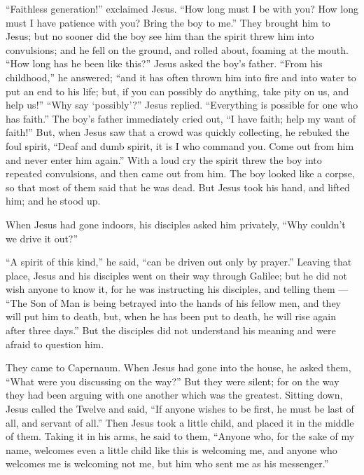  ``Faithless generation!'' exclaimed Jesus. ``How long must
I be with you? How long must I have patience with you? Bring the boy to
me.''  They brought him to Jesus; but no sooner did the boy
see him than the spirit threw him into convulsions; and he fell on the
ground, and rolled about, foaming at the mouth.  ``How long
has he been like this?'' Jesus asked the boy's father. 
``From his childhood,'' he answered; ``and it has often thrown him into
fire and into water to put an end to his life; but, if you can possibly
do anything, take pity on us, and help us!''  ``Why say
`possibly'?'' Jesus replied. ``Everything is possible for one who has
faith.''  The boy's father immediately cried out, ``I have
faith; help my want of faith!''  But, when Jesus saw that a
crowd was quickly collecting, he rebuked the foul spirit, ``Deaf and
dumb spirit, it is I who command you. Come out from him and never enter
him again.''  With a loud cry the spirit threw the boy into
repeated convulsions, and then came out from him. The boy looked like a
corpse, so that most of them said that he was dead.  But
Jesus took his hand, and lifted him; and he stood up.

 When Jesus had gone indoors, his disciples asked him
privately, ``Why couldn't we drive it out?''

 ``A spirit of this kind,'' he said, ``can be driven out
only by prayer.''  Leaving that place, Jesus and his
disciples went on their way through Galilee; but he did not wish anyone
to know it,  for he was instructing his disciples, and
telling them --- ``The Son of Man is being betrayed into the hands of
his fellow men, and they will put him to death, but, when he has been
put to death, he will rise again after three days.''  But
the disciples did not understand his meaning and were afraid to question
him.

 They came to Capernaum. When Jesus had gone into the
house, he asked them, ``What were you discussing on the way?''
 But they were silent; for on the way they had been arguing
with one another which was the greatest.  Sitting down,
Jesus called the Twelve and said, ``If anyone wishes to be first, he
must be last of all, and servant of all.''  Then Jesus took
a little child, and placed it in the middle of them. Taking it in his
arms, he said to them,  ``Anyone who, for the sake of my
name, welcomes even a little child like this is welcoming me, and anyone
who welcomes me is welcoming not me, but him who sent me as his
messenger.''

